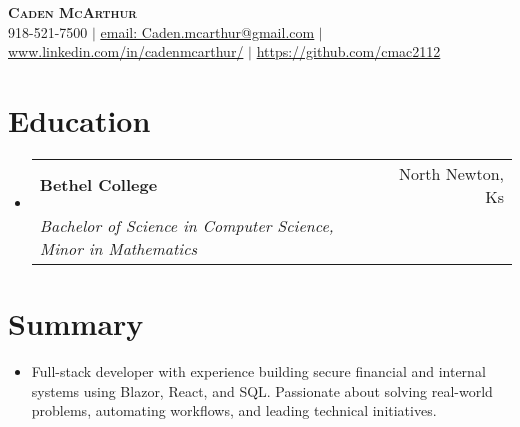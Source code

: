 \documentclass[letterpaper,11pt]{article}
\makeatletter
\newcommand{\resumeItem}[1]{
  \item\small{
    {#1 \vspace{-2pt}}
  }
}
\newcommand{\resumeSubheading}[4]{
  \vspace{-2pt}\item
    \begin{tabular*}{0.97\textwidth}[t]{l@{\extracolsep{\fill}}r}
      \textbf{#1} & #2 \\
      \textit{\small#3} & \textit{\small #4} \\
    \end{tabular*}\vspace{-7pt}
}
\newcommand{\resumeSubHeadingListStart}{\begin{itemize}[leftmargin=0.15in, label={}]}
\newcommand{\resumeSubHeadingListEnd}{\end{itemize}}
\newcommand{\resumeItemListStart}{\begin{itemize}}
\newcommand{\resumeItemListEnd}{\end{itemize}\vspace{-5pt}}
\makeatother
\begin{document}

\begin{center}
    \textbf{\Huge \scshape Caden McArthur   } \\ \vspace{1pt}
    \small 918-521-7500 $|$ \href{mailto:x@x.com}{\underline{email: Caden.mcarthur@gmail.com}} $|$ 
    \underline{www.linkedin.com/in/cadenmcarthur/} $|$
    \underline{https://github.com/cmac2112}
\end{center}


\section{Education}
  \resumeSubHeadingListStart
    \resumeSubheading
      {Bethel College}{North Newton, Ks}
      {Bachelor of Science in Computer Science, Minor in Mathematics}{}
      
  \resumeSubHeadingListEnd

  \section{Summary}
  \resumeItemListStart
\resumeItem{Full-stack developer with experience building secure financial and internal systems using Blazor, React, and SQL. Passionate about solving real-world problems, automating workflows, and leading technical initiatives. }
\resumeItemListEnd
\end{document}
